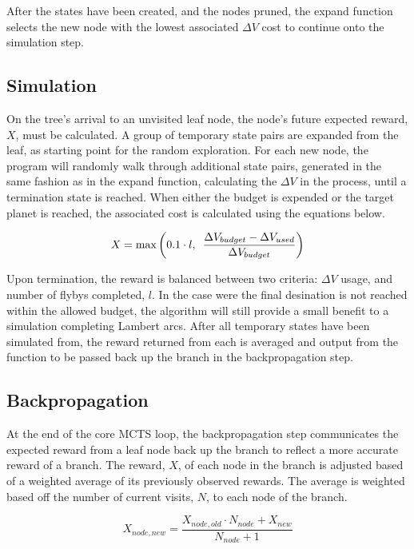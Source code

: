 \documentclass[letterpaper, preprint, paper,11pt]{AAS}	%
\begin{document}
After the states have been created, and the nodes pruned, the expand function selects the new node with the lowest associated $\Delta V$ cost to continue onto the simulation step.

\subsection{Simulation}

On the tree's arrival to an unvisited leaf node, the node's future expected reward, $X$, must be calculated. A group of temporary state pairs are expanded from the leaf, as starting point for the random exploration. For each new node, the program will randomly walk through additional state pairs, generated in the same fashion as in the expand function, calculating the $\Delta V$ in the process, until a termination state is reached. When either the budget is expended or the target planet is reached, the associated cost is calculated using the equations below.

\begin{equation}
    \label{eq:simCost1}
    X = \text{max}\left( 0.1 \cdot l,\hspace{0.5em} \frac{\Delta V_{budget} - \Delta V_{used}}{\Delta V_{budget}} \right)
\end{equation}

Upon termination, the reward is balanced between two criteria: $\Delta V$ usage, and number of flybys completed, $l$. In the case were the final desination is not reached within the allowed budget, the algorithm will still provide a small benefit to a simulation completing Lambert arcs. After all temporary states have been simulated from, the reward returned from each is averaged and output from the function to be passed back up the branch in the backpropagation step.

\subsection{Backpropagation}

At the end of the core MCTS loop, the backpropagation step communicates the expected reward from a leaf node back up the branch to reflect a more accurate reward of a branch. The reward, $X$, of each node in the branch is adjusted based of a weighted average of its previously observed rewards. The average is weighted based off the number of current visits, $N$, to each node of the branch.

\begin{equation}
    \label{eq:bp}
    X_{node, new} = \frac{X_{node, old} \cdot N_{node} + X_{new}}{N_{node} + 1}
\end{equation}
\end{document}
